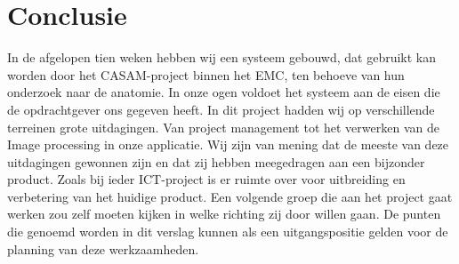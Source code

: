 \section{Conclusie}
\label{Conclusie}
In de afgelopen tien weken hebben wij een systeem gebouwd, dat gebruikt kan worden door het CASAM-project binnen het EMC, ten behoeve van hun onderzoek naar de anatomie.
In onze ogen voldoet het systeem aan de eisen die de opdrachtgever ons gegeven heeft. 
In dit project hadden wij op verschillende terreinen grote uitdagingen.
Van project management tot het verwerken van de Image processing in onze applicatie.
Wij zijn van mening dat de meeste van deze uitdagingen gewonnen zijn en dat zij hebben meegedragen aan een bijzonder product. 
Zoals bij ieder ICT-project is er ruimte over voor uitbreiding en verbetering van het huidige product.
Een volgende groep die aan het project gaat werken zou zelf moeten kijken in welke richting zij door willen gaan.
De punten die genoemd worden in dit verslag kunnen als een uitgangspositie gelden voor de planning van deze werkzaamheden.